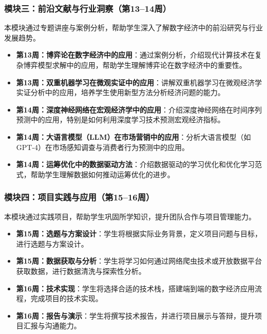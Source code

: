 \documentclass[lang=cn,12pt,a4paper]{elegantpaper}
\begin{document}
\subsubsection{模块三：前沿文献与行业洞察（第13--14周）} \label{sec:module3}
本模块通过专题讲座与案例分析，帮助学生深入了解数字经济中的前沿研究与行业发展趋势。
\begin{itemize}
    \item \textbf{第13周：博弈论在数字经济中的应用}：通过案例分析，介绍现代计算技术在复杂博弈模型求解中的应用，帮助学生理解博弈论在数字经济中的重要性\citep{sandholm2010state,hu2023recent}。
    \item \textbf{第13周：双重机器学习在微观实证中的应用}：讲解双重机器学习在微观经济学实证分析中的应用，培养学生使用新型方法分析经济问题的能力\citep{chernozhukov2018double,athey2019machine}。
    \item \textbf{第14周：深度神经网络在宏观经济学中的应用}：介绍深度神经网络在时间序列预测中的应用，特别是如何利用深度学习技术预测宏观经济指标\citep{lim2021time,benidis2022deep}。
    \item \textbf{第14周：大语言模型（LLM）在市场营销中的应用}：分析大语言模型（如GPT-4）在市场感知调查与消费者行为预测中的应用\citep{wang2024large,arora2025ai}。
    \item \textbf{第14周：运筹优化中的数据驱动方法}：介绍数据驱动的学习优化和优化学习范式，帮助学生理解数据如何推动运筹优化的进步\citep{andrychowicz2016learning,chen2022learning}。
\end{itemize}

\subsubsection{模块四：项目实践与应用（第15--16周）} \label{sec:module4}
本模块通过实践项目，帮助学生巩固所学知识，提升团队合作与项目管理能力。
\begin{itemize}
    \item \textbf{第15周：选题与方案设计}：学生将根据实际业务背景，定义项目问题与目标，进行选题与方案设计。
    \item \textbf{第15周：数据获取与分析}：学生将学习如何通过网络爬虫技术或开放数据平台获取数据，进行数据清洗与探索性分析。
    \item \textbf{第16周：技术实现}：学生将选择合适的技术栈，搭建端到端的数字经济应用流程，完成项目的技术实现。
    \item \textbf{第16周：报告与演示}：学生将撰写技术报告，并进行项目展示与答辩，提升项目汇报与沟通能力。
\end{itemize}
\end{document}
